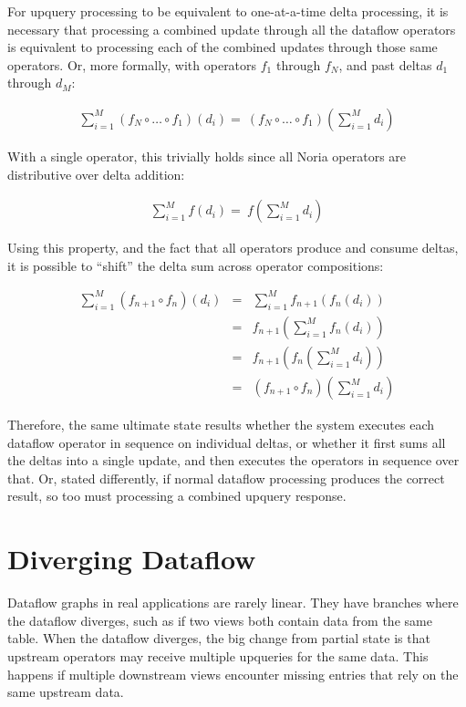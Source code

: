 For upquery processing to be equivalent to one-at-a-time delta processing, it is
necessary that processing a combined update through all the dataflow operators
is equivalent to processing each of the combined updates through those same
operators. Or, more formally, with operators $f_1$ through $f_N$, and past
deltas $d_1$ through $d_M$:

\begin{eqnarray*}
  \sum^M_{i=1}\left(f_N \circ \dots \circ f_1\right)\left(d_i\right) = \
  \left(f_N \circ \dots \circ f_1\right)\left(\sum^M_{i=1}d_i\right)
\end{eqnarray*}

With a single operator, this trivially holds since all Noria operators are
distributive over delta addition:

\begin{eqnarray*}
  \sum^M_{i=1}f\left(d_i\right) = \
  f\left(\sum^M_{i=1}d_i\right)
\end{eqnarray*}

Using this property, and the fact that all operators produce and consume deltas,
it is possible to ``shift'' the delta sum across operator compositions:

\begin{eqnarray*}
  \sum^M_{i=1}\left(f_{n+1} \circ f_n\right)\left(d_i\right) &=& \sum^M_{i=1}f_{n+1}\left(f_n\left(d_i\right)\right) \\
  &=& f_{n+1}\left(\sum^M_{i=1}f_n\left(d_i\right)\right) \\
  &=& f_{n+1}\left(f_n\left(\sum^M_{i=1}d_i\right)\right) \\
  &=& \left(f_{n+1} \circ f_n\right)\left(\sum^M_{i=1}d_i\right)
\end{eqnarray*}

Therefore, the same ultimate state results whether the system executes each
dataflow operator in sequence on individual deltas, or whether it first sums
all the deltas into a single update, and then executes the operators in sequence
over that. Or, stated differently, if normal dataflow processing produces the
correct result, so too must processing a combined upquery response.

\section{Diverging Dataflow}

Dataflow graphs in real applications are rarely linear. They have branches where
the dataflow diverges, such as if two views both contain data from the same
table. When the dataflow diverges, the big change from partial state is that
upstream operators may receive multiple upqueries for the same data. This
happens if multiple downstream views encounter missing entries that rely on the
same upstream data.

